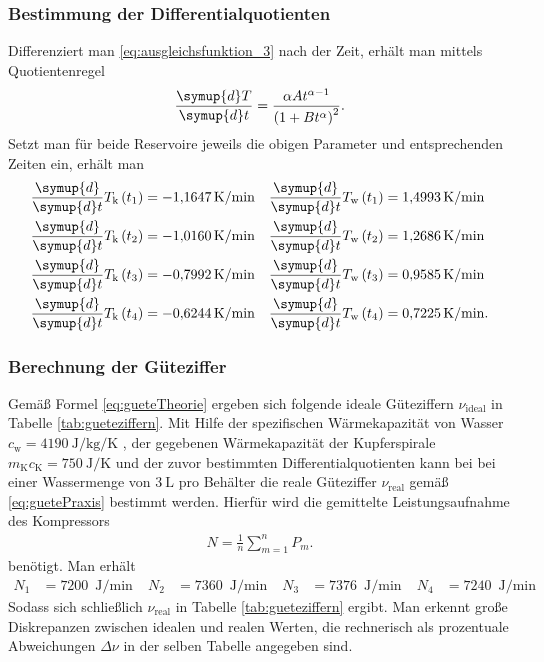 \subsubsection[]{Bestimmung der Differentialquotienten}
\label{sec: dif_quot}
Differenziert man \eqref{eq:ausgleichsfunktion_3} nach der Zeit, erhält man mittels Quotientenregel
\begin{align*}
    \frac{\symup{d}T}{\symup{d}t} = \frac{\alpha A t^{\alpha -1}}{\left(1 + B t^{\alpha}\right)^2}.
\end{align*}
%
Setzt man für beide Reservoire jeweils die obigen Parameter und entsprechenden Zeiten ein, erhält man 
\begin{align*}
    \frac{\symup{d}}{\symup{d}t} T_\text{k} \left(t_1\right) &=  \qty[]{-1.1647}{\kelvin\per\min}  &
    \frac{\symup{d}}{\symup{d}t} T_\text{w} \left(t_1\right) &=  \qty[]{ 1.4993}{\kelvin\per\min}   \\
    \frac{\symup{d}}{\symup{d}t} T_\text{k} \left(t_2\right) &=  \qty[]{-1.0160}{\kelvin\per\min}  &
    \frac{\symup{d}}{\symup{d}t} T_\text{w} \left(t_2\right) &=  \qty[]{ 1.2686}{\kelvin\per\min} \\
    \frac{\symup{d}}{\symup{d}t} T_\text{k} \left(t_3\right) &=  \qty[]{-0.7992}{\kelvin\per\min} &
    \frac{\symup{d}}{\symup{d}t} T_\text{w} \left(t_3\right) &=  \qty[]{ 0.9585}{\kelvin\per\min} \\
    \frac{\symup{d}}{\symup{d}t} T_\text{k} \left(t_4\right) &=  \qty[]{-0.6244}{\kelvin\per\min}  &
    \frac{\symup{d}}{\symup{d}t} T_\text{w} \left(t_4\right) &=  \qty[]{ 0.7225}{\kelvin\per\min}.
\end{align*}
%

\subsubsection[]{Berechnung der Güteziffer}
Gemäß Formel \eqref{eq:gueteTheorie} ergeben sich folgende ideale Güteziffern $\nu_\text{ideal}$ in Tabelle \ref{tab:gueteziffern}.
%
Mit Hilfe der spezifischen Wärmekapazität von Wasser $c_{\text{w}} = \qty{4190}{\joule\per\kg\per\kelvin}$ \cite[]{leifi}, der gegebenen Wärmekapazität
der Kupferspirale $m_{\text{K}} c_{\text{K}} = \qty{750}{\joule\per\kelvin}$ und der zuvor bestimmten Differentialquotienten
kann bei bei einer Wassermenge von $\qty[]{3}{\liter}$ pro Behälter die reale Güteziffer $\nu_{\text{real}}$ gemäß \eqref{eq:guetePraxis} bestimmt werden.
Hierfür wird die gemittelte Leistungsaufnahme des Kompressors
\begin{align*}
    N = \frac{1}{n} \sum_{m=1}^{n} P_m.
\end{align*}
benötigt.
Man erhält
\begin{align*}
    N_1  &=  \qty[]{7200}{\J\per\min} &
    N_2  &=  \qty[]{7360}{\J\per\min} &
    N_3  &=  \qty[]{7376}{\J\per\min} &
    N_4  &=  \qty[]{7240}{\J\per\min}
\end{align*}
Sodass sich schließlich  $\nu_\text{real}$ in Tabelle \ref{tab:gueteziffern} ergibt.
Man erkennt große Diskrepanzen zwischen idealen und realen Werten,
die rechnerisch als prozentuale Abweichungen $\Delta \nu$ in der selben Tabelle angegeben sind.

